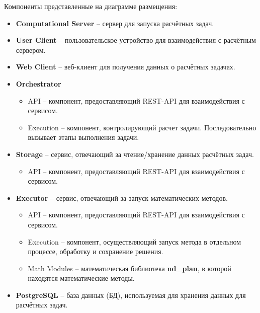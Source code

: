 \noindent Компоненты представленные на диаграмме размещения:
\begin{itemize}
	\item \textbf{Computational Server} -- сервер для запуска расчётных задач.
	\item \textbf{User Client} -- пользовательское устройство для взаимодействия с расчётным сервером.
	\item \textbf{Web Client} -- веб-клиент для получения данных о расчётных задачах.
	\item \textbf{Orchestrator}
	\begin{itemize}
		\item API -- компонент, предоставляющий REST-API для взаимодействия с сервисом.
		\item Execution -- компонент, контролирующий расчет задачи. Последовательно вызывает этапы выполнения задачи.
	\end{itemize}
	\item \textbf{Storage} -- сервис, отвечающий за чтение/хранение данных расчётных задач.
	\begin{itemize}
		\item API -- компонент, предоставляющий REST-API для взаимодействия с сервисом.
	\end{itemize}
	\item \textbf{Executor} -- сервис, отвечающий за запуск математических методов.
	\begin{itemize}
		\item API -- компонент, предоставляющий REST-API для взаимодействия с сервисом.
		\item Execution -- компонент, осуществляющий запуск метода в отдельном процессе, обработку и сохранение решения.
		\item Math Modules -- математическая библиотека \textbf{nd\_plan}, в которой находятся математические методы.
	\end{itemize}
	\item \textbf{PostgreSQL} -- база данных (БД), используемая для хранения данных для расчётных задач.
\end{itemize}

